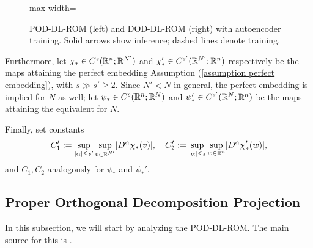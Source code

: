 \begin{figure}[tb]
\begin{adjustbox}{max width=\linewidth}
    \end{adjustbox}
    \caption{POD-DL-ROM (left) and DOD-DL-ROM (right) with autoencoder training. Solid arrows show inference; 
    dashed lines denote training.}
    \label{fig:dimensional-workflow-pod-dlrom-dod-dlrom}
  \end{figure}
  
  


Furthermore, let $\chi_* \in C^s(\mathbb{R}^n; \mathbb{R}^{N'})$ and $\chi_*' \in C^{s'}(\mathbb{R}^{N'}; \mathbb{R}^n)$ respectively be the maps attaining
the perfect embedding Assumption (\ref{assumption perfect embedding}), with $s \gg s' \geq 2$. Since $N' < N$ in
general, the perfect embedding is implied for $N$ as well; let $\psi_* \in C^s(\mathbb{R}^n; \mathbb{R}^N)$ 
and $\psi_*' \in C^{s'}(\mathbb{R}^N; \mathbb{R}^n)$ be the maps attaining the equivalent for $N$.

Finally, set constants
\begin{equation*}
    C_1' := \sup\limits_{\vert \alpha \vert \leq s'} \sup\limits_{v \in \mathbb{R}^{N'}} \lvert D^\alpha \chi_*(v) \rvert, 
    \quad 
    C_2' := \sup\limits_{\vert \alpha \vert \leq s} \sup\limits_{w \in \mathbb{R}^n} \lvert D^\alpha \chi_*'(w) \rvert,
\end{equation*} 
and $C_1, C_2$ analogously for $\psi_*$ and $\psi_*'$. 





\subsection{Proper Orthogonal Decomposition Projection}




In this subsection, we will start by analyzing the POD-DL-ROM. The main source for this is 
\cite{brivio2023}.

